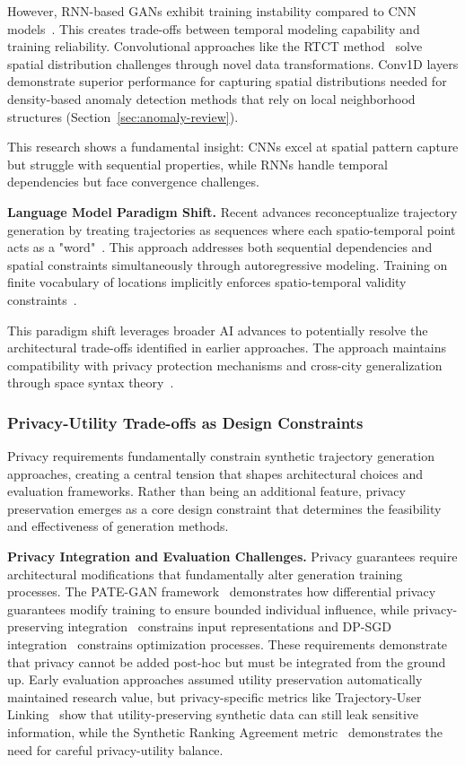 \documentclass[runningheads]{llncs}
\begin{document}
However, RNN-based GANs exhibit training instability compared to CNN models~\cite{merhi2024synthetic}. This creates trade-offs between temporal modeling capability and training reliability. Convolutional approaches like the RTCT method~\cite{merhi2024synthetic} solve spatial distribution challenges through novel data transformations. Conv1D layers demonstrate superior performance for capturing spatial distributions needed for density-based anomaly detection methods that rely on local neighborhood structures (Section~\ref{sec:anomaly-review}).

This research shows a fundamental insight: CNNs excel at spatial pattern capture but struggle with sequential properties, while RNNs handle temporal dependencies but face convergence challenges.

\textbf{Language Model Paradigm Shift.} Recent advances reconceptualize trajectory generation by treating trajectories as sequences where each spatio-temporal point acts as a "word"~\cite{zhang2025end}. This approach addresses both sequential dependencies and spatial constraints simultaneously through autoregressive modeling. Training on finite vocabulary of locations implicitly enforces spatio-temporal validity constraints~\cite{kong2023mobility}.

This paradigm shift leverages broader AI advances to potentially resolve the architectural trade-offs identified in earlier approaches. The approach maintains compatibility with privacy protection mechanisms and cross-city generalization through space syntax theory~\cite{wang2025gtg}.

\subsubsection{Privacy-Utility Trade-offs as Design Constraints}

Privacy requirements fundamentally constrain synthetic trajectory generation approaches, creating a central tension that shapes architectural choices and evaluation frameworks. Rather than being an additional feature, privacy preservation emerges as a core design constraint that determines the feasibility and effectiveness of generation methods.

\textbf{Privacy Integration and Evaluation Challenges.} Privacy guarantees require architectural modifications that fundamentally alter generation training processes. The PATE-GAN framework~\cite{jordon2019pate} demonstrates how differential privacy guarantees modify training to ensure bounded individual influence, while privacy-preserving integration~\cite{rao2023cats} constrains input representations and DP-SGD integration~\cite{merhi2024synthetic} constrains optimization processes. These requirements demonstrate that privacy cannot be added post-hoc but must be integrated from the ground up. Early evaluation approaches assumed utility preservation automatically maintained research value, but privacy-specific metrics like Trajectory-User Linking~\cite{rao2023cats} show that utility-preserving synthetic data can still leak sensitive information, while the Synthetic Ranking Agreement metric~\cite{jordon2019pate} demonstrates the need for careful privacy-utility balance.
\end{document}
